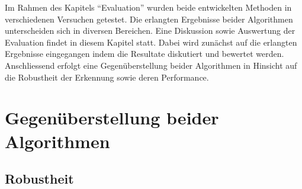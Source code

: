 Im Rahmen des Kapitels \enquote{Evaluation} wurden beide entwickelten Methoden in verschiedenen Versuchen getestet. Die erlangten Ergebnisse beider Algorithmen unterscheiden sich in diversen Bereichen. Eine Diskussion sowie Auswertung der Evaluation findet in diesem Kapitel statt. Dabei wird zunächst auf die erlangten Ergebnisse eingegangen indem die Resultate diskutiert und bewertet werden. Anschliessend erfolgt eine Gegenüberstellung beider Algorithmen in Hinsicht auf die Robustheit der Erkennung sowie deren Performance.







% 

\section{Gegenüberstellung beider Algorithmen}
\label{sec:gegenueberstellung}

\subsection{Robustheit}
\label{subsec:discussion_robsutness}




